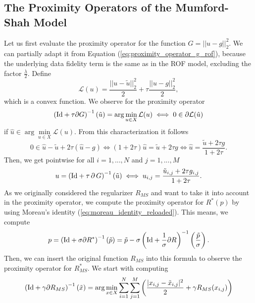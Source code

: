 \documentclass[abstracton]{scrreprt}
\begin{document}
        \subsection{The Proximity Operators of the Mumford-Shah Model} %
        \label{sub:the_proximity_operators_of_the_mumford_shah_model}
            Let us first evaluate the proximity operator for the function $G = ||u - g||_{2}^{2}$. We can partially adapt it from Equation (\ref{eq:proximity_operator_g_rof}), because the underlying data fidelity term is the same as in the ROF model, excluding the factor $\frac{\lambda}{2}$. Define
                $$
                    \mathcal{L}(u) = \frac{||u - \tilde{u}||_{2}^{2}}{2} + \tau \frac{||u - g||_{2}^{2}}{2},
                $$
            which is a convex function. We observe for the proximity operator
                $$
                    \left( \textnormal{Id} + \tau \partial G \right)^{-1}(\tilde{u}) = \arg \min_{u \in X} \mathcal{L}(u) \iff 0 \in \partial \mathcal{L}(\hat{u})
                $$
            if $\hat{u} \in \arg\min\limits_{u \in X} \mathcal{L}(u)$. From this characterization it follows
                $$
                    0 \in \hat{u} - \tilde{u} + 2\tau (\hat{u} - g) \iff (1 + 2\tau)\hat{u} = \tilde{u} + 2\tau g \iff \hat{u} = \frac{\tilde{u} + 2\tau g}{1 + 2\tau}.
                $$
            Then, we get pointwise for all $i = 1, ..., N$ and $j = 1, ..., M$
                $$
                    u = \left( \textnormal{Id} + \tau\,\partial\,G \right)^{-1}(\tilde{u}) \iff u_{i,j} = \frac{\tilde{u}_{i,j} + 2\tau g_{i,j}}{1 + 2\tau}.
                $$
            As we originally considered the regularizer $R_{MS}$ and want to take it into account in the proximity operator, we compute the proximity operator for $R^{\ast}(p)$ by using Moreau's identity (\ref{eq:moreau_identity_reloaded}). This means, we compute
                \begin{equation}
                    p = \left( \textnormal{Id} + \sigma \partial R^{\ast} \right)^{-1}(\tilde{p}) = \tilde{p} - \sigma \left( \textnormal{Id} + \frac{1}{\sigma} \partial R \right)^{-1} \left(\frac{\tilde{p}}{\sigma} \right).
                \label{eq:moreau_mumford_shah_regularizer}
                \end{equation}
            Then, we can insert the original function $R_{MS}$ into this formula to observe the proximity operator for $R^{\ast}_{MS}$. We start with computing
                $$
                    \left( \textnormal{Id} + \gamma\partial R_{MS} \right)^{-1}(\tilde{x}) = \arg \min_{x \in X} \sum_{i = 1}^{N} \sum_{j = 1}^{M} \left( \frac{|x_{i,j} - \tilde{x}_{i,j}|^{2}}{2} + \gamma R_{MS}(x_{i,j}) \right)
                $$
\end{document}
